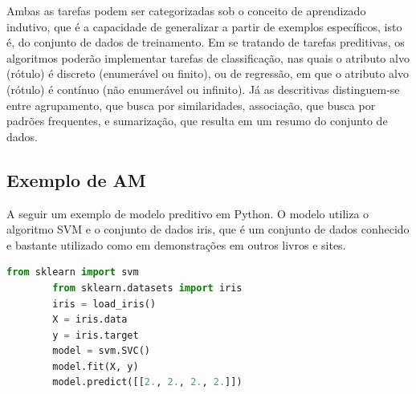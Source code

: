 \documentclass[a4paper,12pt]{book}
\begin{document}
	Ambas as tarefas podem ser categorizadas sob o conceito de aprendizado indutivo, que é a capacidade de generalizar a partir de exemplos específicos, isto é, do conjunto de dados de treinamento. Em se tratando de tarefas preditivas, os algoritmos poderão implementar tarefas de classificação, nas quais o atributo alvo (rótulo) é discreto (enumerável ou finito), ou de regressão, em que o atributo alvo (rótulo) é contínuo (não enumerável ou infinito). Já as descritivas distinguem-se entre agrupamento, que busca por similaridades, associação, que busca por padrões frequentes, e sumarização, que resulta em um resumo do conjunto de dados.
	
	
	\subsection{Exemplo de AM}
	
	A seguir um exemplo de modelo preditivo em Python. O modelo utiliza o algoritmo SVM e o conjunto de dados iris, que é um conjunto de dados conhecido e bastante utilizado como em demonstrações em outros livros e sites.
	
	\begin{lstlisting}[language=Python, caption={Exemplo de código que usa AM}]
		from sklearn import svm
		from sklearn.datasets import iris
		iris = load_iris()
		X = iris.data
		y = iris.target
		model = svm.SVC()
		model.fit(X, y)
		model.predict([[2., 2., 2., 2.]])
	\end{lstlisting}
	
	
	
	
	
	
\end{document}

